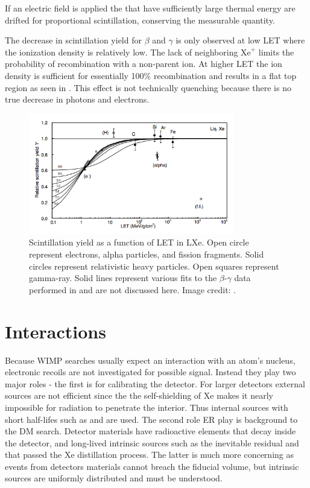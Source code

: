 If an electric field is applied the \electron that have sufficiently large thermal energy are drifted for
proportional scintillation, conserving the measurable quantity.

The decrease in scintillation yield for $\beta$ and $\gamma$ is only observed at low LET where the ionization density is relatively low.  The
lack of neighboring $\mathrm{Xe}^{+}$ limits the probability of recombination with a non-parent ion.  At higher LET the ion density
is sufficient for essentially 100\% recombination and results in a flat top region as seen in .  This
effect is not technically quenching because there is no true decrease in photons and electrons.

\begin{figure}
\includegraphics[width=0.8\textwidth]{ScintillationYield}
\caption{Scintillation yield as a function of LET in LXe.  Open circle represent electrons, alpha particles, and fission fragments.  Solid
circles represent relativistic heavy particles.  Open squares represent gamma-ray.  Solid lines represent various fits to the
$\beta$-$\gamma$
data performed in  and are not discussed here.  Image credit: .}
\label{fig:scintillation_yield}
\end{figure}



\section{Interactions}
\label{sec:interactions}
Because WIMP searches usually expect an interaction with an atom's nucleus, electronic recoils are not investigated for possible
signal.  Instead they play two major roles - the first is for calibrating the detector.  For larger detectors external sources are
not efficient since the the self-shielding of Xe makes it nearly impossible for radiation to penetrate the interior.  Thus internal
sources with short half-lifes such as \kryptonmeta and \radoncal are used.  The second role ER play is background to the DM
search.  Detector materials have radioactive elements that decay inside the detector, and long-lived intrinsic sources such as
the inevitable residual \krypton and \radon that passed the Xe distillation process.  The latter is much more concerning as events from
detectors materials cannot breach the fiducial volume, but intrinsic sources are uniformly distributed and must be understood.

